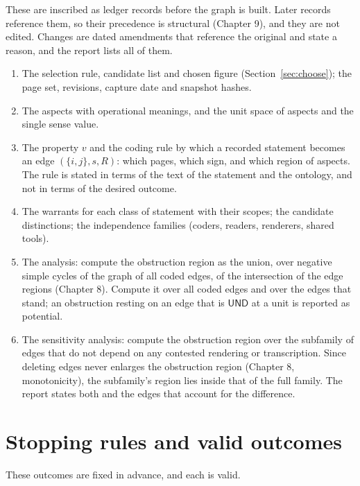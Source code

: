 \documentclass[11pt]{article}
\newcommand{\UND}{\textsf{UND}}
\begin{document}
These are inscribed as ledger records before the graph is built. Later records reference them, so their precedence is structural (Chapter 9), and they are not edited. Changes are dated amendments that reference the original and state a reason, and the report lists all of them.

\begin{enumerate}[label=(P\arabic*),nosep]
\item The selection rule, candidate list and chosen figure (Section~\ref{sec:choose}); the page set, revisions, capture date and snapshot hashes.
\item The aspects with operational meanings, and the unit space of aspects and the single sense value.
\item The property $v$ and the coding rule by which a recorded statement becomes an edge $(\{i,j\},s,R)$: which pages, which sign, and which region of aspects. The rule is stated in terms of the text of the statement and the ontology, and not in terms of the desired outcome.
\item The warrants for each class of statement with their scopes; the candidate distinctions; the independence families (coders, readers, renderers, shared tools).
\item The analysis: compute the obstruction region as the union, over negative simple cycles of the graph of all coded edges, of the intersection of the edge regions (Chapter 8). Compute it over all coded edges and over the edges that stand; an obstruction resting on an edge that is $\UND$ at a unit is reported as potential.
\item The sensitivity analysis: compute the obstruction region over the subfamily of edges that do not depend on any contested rendering or transcription. Since deleting edges never enlarges the obstruction region (Chapter 8, monotonicity), the subfamily's region lies inside that of the full family. The report states both and the edges that account for the difference.
\end{enumerate}

\section{Stopping rules and valid outcomes}\label{sec:stop}

These outcomes are fixed in advance, and each is valid.
\end{document}
